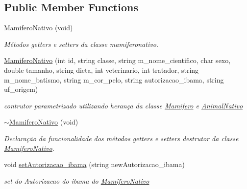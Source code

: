 \subsection*{Public Member Functions}
\begin{DoxyCompactItemize}
\item 
\mbox{\label{class_mamifero_nativo_ad443e8d82e3a622afd2259687bdaaa96}} 
\mbox{\hyperlink{class_mamifero_nativo_ad443e8d82e3a622afd2259687bdaaa96}{Mamifero\+Nativo}} (void)
\begin{DoxyCompactList}\small\item\em Métodos getters e setters da classe mamiferonativo. \end{DoxyCompactList}\item 
\mbox{\label{class_mamifero_nativo_a961e157127c9e0388c81ce977058f07f}} 
\mbox{\hyperlink{class_mamifero_nativo_a961e157127c9e0388c81ce977058f07f}{Mamifero\+Nativo}} (int id, string classe, string m\+\_\+nome\+\_\+cientifico, char sexo, double tamanho, string dieta, int veterinario, int tratador, string m\+\_\+nome\+\_\+batismo, string m\+\_\+cor\+\_\+pelo, string autorizacao\+\_\+ibama, string uf\+\_\+origem)
\begin{DoxyCompactList}\small\item\em contrutor parametrizado utilizando herança da classe \mbox{\hyperlink{class_mamifero}{Mamifero}} e \mbox{\hyperlink{class_animal_nativo}{Animal\+Nativo}} \end{DoxyCompactList}\item 
\mbox{\label{class_mamifero_nativo_a2d8fe0cbeae97534b52b49c4b265f4ff}} 
\mbox{\hyperlink{class_mamifero_nativo_a2d8fe0cbeae97534b52b49c4b265f4ff}{$\sim$\+Mamifero\+Nativo}} (void)
\begin{DoxyCompactList}\small\item\em Declaração da funcionalidade dos métodos getters e setters destrutor da classe \mbox{\hyperlink{class_mamifero_nativo}{Mamifero\+Nativo}}. \end{DoxyCompactList}\item 
void \mbox{\hyperlink{class_mamifero_nativo_a3426276cd2af2e7740192b26f34475e9}{set\+Autorizacao\+\_\+ibama}} (string new\+Autorizacao\+\_\+ibama)
\begin{DoxyCompactList}\small\item\em set do Autorizacao do ibama do \mbox{\hyperlink{class_mamifero_nativo}{Mamifero\+Nativo}} \end{DoxyCompactList}\item 

\end{DoxyCompactItemize}

